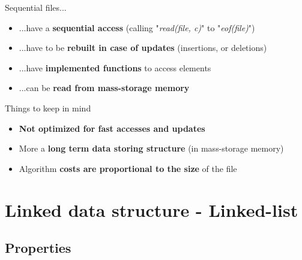 \documentclass{beamer}[10pt, usepdftitle=false, handout]
\begin{document}
	\begin{frame}
	
	Sequential files...
	
	\begin{itemize}
		\item {...have a \textbf{sequential access} (calling "\textit{read(file, c)}" to "\textit{eof(file)}")}
		\item {...have to be \textbf{rebuilt in case of updates} (insertions, or deletions)} 	
		\item {...have \textbf{implemented functions} to access elements}
		\item {...can be \textbf{read from mass-storage memory}}
	\end{itemize}		
	
	\pause	
	
	\begin{alertblock}{Things to keep in mind}
	\begin{itemize}
	\item{\textbf{Not optimized for fast accesses and updates}}
	\item{More a \textbf{long term data storing structure} (in mass-storage memory)}
	\item{Algorithm \textbf{costs are proportional to the size} of the file}
	\end{itemize}
	\end{alertblock}		
	
	\end{frame}
	
	\section{Linked data structure - Linked-list}	
	\subsection{Properties}	
		
\end{document}
